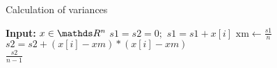 \documentclass[11pt,compress,t,notes=noshow, xcolor=table]{beamer}
\begin{document}
\begin{vbframe}{Calculation of variances}
\normalsize
\framebreak

\begin{algorithm}[H]
  \begin{center}
  \caption{Calculation of variance in \texttt{R} (simplified)}
    \begin{algorithmic}[1]
    \State \textbf{Input:} $x \in \R^n$
    \State $s1 = s2 = 0;$
      \State $s1 = s1 + x[i]$
    \EndFor
    \State $\text{xm} \leftarrow \frac{s1}{n}$
      \State $s2 = s2 + (x[i] - xm) * (x[i] - xm)$
    \EndFor \\
    \Return $\frac{s2}{n - 1}$
    \end{algorithmic}
    \end{center}
\end{algorithm}

\vspace*{-0.5cm}


\end{vbframe}






\endlecture
\end{document}
